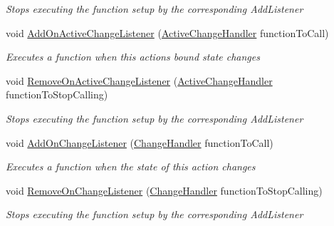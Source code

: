 \begin{DoxyCompactItemize}
\begin{DoxyCompactList}\small\item\em Stops executing the function setup by the corresponding Add\+Listener \end{DoxyCompactList}\item 
void \mbox{\hyperlink{class_valve_1_1_v_r_1_1_steam_v_r___action___skeleton_a25ef48bc746787e1432040dc0e2cf0fc}{Add\+On\+Active\+Change\+Listener}} (\mbox{\hyperlink{class_valve_1_1_v_r_1_1_steam_v_r___action___skeleton_ae329ff2582f41c7ec52ecdf3b34b345a}{Active\+Change\+Handler}} function\+To\+Call)
\begin{DoxyCompactList}\small\item\em Executes a function when this action\textquotesingle{}s bound state changes \end{DoxyCompactList}\item 
void \mbox{\hyperlink{class_valve_1_1_v_r_1_1_steam_v_r___action___skeleton_aefc772e4655cee6df2ac7794cab5c57b}{Remove\+On\+Active\+Change\+Listener}} (\mbox{\hyperlink{class_valve_1_1_v_r_1_1_steam_v_r___action___skeleton_ae329ff2582f41c7ec52ecdf3b34b345a}{Active\+Change\+Handler}} function\+To\+Stop\+Calling)
\begin{DoxyCompactList}\small\item\em Stops executing the function setup by the corresponding Add\+Listener \end{DoxyCompactList}\item 
void \mbox{\hyperlink{class_valve_1_1_v_r_1_1_steam_v_r___action___skeleton_ae5b064c4cc4ac0bdfd8677e126896cf4}{Add\+On\+Change\+Listener}} (\mbox{\hyperlink{class_valve_1_1_v_r_1_1_steam_v_r___action___skeleton_a41a68545cb313ef9f47600d9e9022177}{Change\+Handler}} function\+To\+Call)
\begin{DoxyCompactList}\small\item\em Executes a function when the state of this action changes \end{DoxyCompactList}\item 
void \mbox{\hyperlink{class_valve_1_1_v_r_1_1_steam_v_r___action___skeleton_a766a14c9618f04ba29f2b457fe29f59d}{Remove\+On\+Change\+Listener}} (\mbox{\hyperlink{class_valve_1_1_v_r_1_1_steam_v_r___action___skeleton_a41a68545cb313ef9f47600d9e9022177}{Change\+Handler}} function\+To\+Stop\+Calling)
\begin{DoxyCompactList}\small\item\em Stops executing the function setup by the corresponding Add\+Listener \end{DoxyCompactList}\item 

\end{DoxyCompactItemize}
